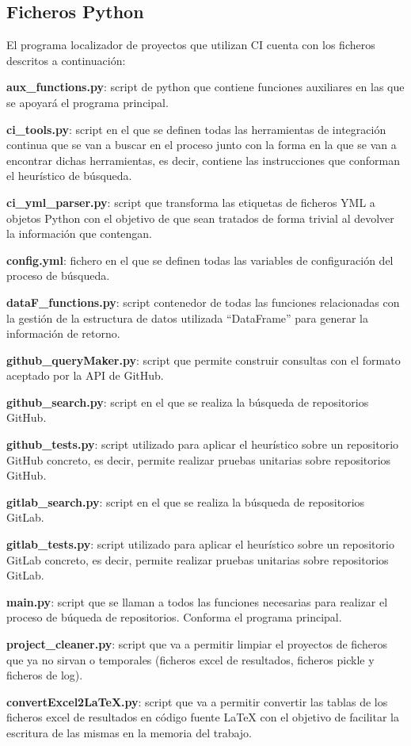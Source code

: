 \subsection{Ficheros Python}
El programa localizador de proyectos que utilizan CI cuenta con los ficheros descritos a continuación:
\begin{compactitem}
    \item \textbf{aux\_functions.py}: script de python que contiene funciones auxiliares en las que se apoyará el programa principal.
    \item \textbf{ci\_tools.py}: script en el que se definen todas las herramientas de integración continua que se van a buscar en el proceso junto con la forma en la que se van a encontrar dichas herramientas, es decir, contiene las instrucciones que conforman el heurístico de búsqueda.
    \item \textbf{ci\_yml\_parser.py}: script que transforma las etiquetas de ficheros YML a objetos Python con el objetivo de que sean tratados  de forma trivial al devolver la información que contengan.
    \item \textbf{config.yml}: fichero en el que se definen todas las variables de configuración del proceso de búsqueda.
    \item \textbf{dataF\_functions.py}: script contenedor de todas las funciones relacionadas con la gestión de la estructura de datos utilizada ``DataFrame'' para generar la información de retorno.
    \item \textbf{github\_queryMaker.py}: script que permite construir consultas con el formato aceptado por la API de GitHub.
    \item \textbf{github\_search.py}: script en el que se realiza la búsqueda de repositorios GitHub.
    \item \textbf{github\_tests.py}: script utilizado para aplicar el heurístico sobre un repositorio GitHub concreto, es decir, permite realizar pruebas unitarias sobre repositorios GitHub.
    \item \textbf{gitlab\_search.py}: script en el que se realiza la búsqueda de repositorios GitLab.
    \item \textbf{gitlab\_tests.py}: script utilizado para aplicar el heurístico sobre un repositorio GitLab concreto, es decir, permite realizar pruebas unitarias sobre repositorios GitLab.
    \item \textbf{main.py}: script que se llaman a todos las funciones necesarias para realizar el proceso de búqueda de repositorios. Conforma el programa principal.
    \item \textbf{project\_cleaner.py}: script que va a permitir limpiar el proyectos de ficheros que ya no sirvan o temporales (ficheros excel de resultados, ficheros pickle y ficheros de log).
    \item \textbf{convertExcel2LaTeX.py}: script que va a permitir convertir las tablas de los ficheros excel de resultados en código fuente LaTeX con el objetivo de facilitar la escritura de las mismas en la memoria del trabajo.
\end{compactitem}

